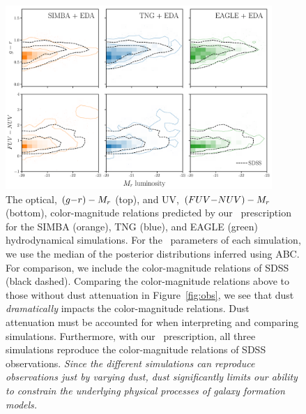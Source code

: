 \begin{figure}
\begin{center}
    \includegraphics[width=0.9\textwidth]{figs/abc_observables.pdf}
    \caption{\label{fig:dem}
    The optical, $(g{-}r) - M_r$ (top), and UV, $(FUV{-}NUV) - M_r$ (bottom),
    color-magnitude relations predicted by our \eda~prescription
    for the SIMBA (orange), TNG (blue), and EAGLE (green) hydrodynamical
    simulations. For the \eda~parameters of each simulation, we use the
    median of the posterior distributions inferred using ABC. For
    comparison, we include the color-magnitude relations of SDSS (black
    dashed). Comparing the color-magnitude relations above to those without
    dust attenuation in Figure~\ref{fig:obs}, we see that dust
    \emph{dramatically} impacts the color-magnitude relations. 
    Dust attenuation must be accounted for when interpreting and comparing
    simulations. Furthermore, with our \eda~prescription, all three
    simulations reproduce the color-magnitude relations of SDSS
    observations.  \emph{Since the different simulations can reproduce
    observations just by varying dust, dust significantly limits our ability to
    constrain the underlying physical processes of galaxy formation
    models.}
    }
\end{center}
\end{figure}


